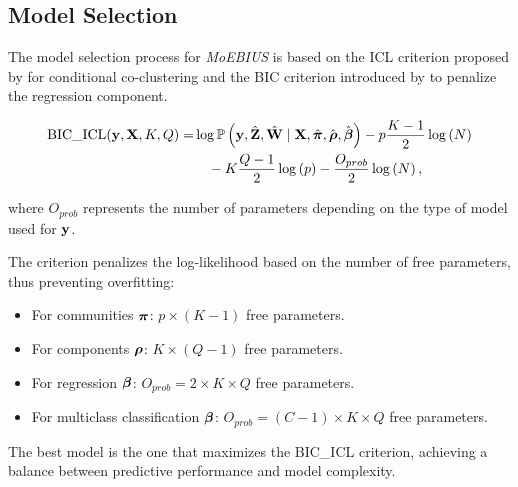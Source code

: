 



\subsection{Model Selection}

The model selection process for \textit{MoEBIUS} is based on the ICL criterion proposed by \cite{goffinet2020conditional} for conditional co-clustering and the BIC criterion introduced by \cite{schwarz1978estimating} to penalize the regression component.

\begin{align}
    \operatorname{BIC\_ICL}(\mathbf{y}, \mathbf{X},K,Q) =& \log \operatorname{\mathbb{P}} \left(\mathbf{y},\hat{\mathbf{Z}},\hat{\mathbf{W}} \mid \mathbf{X},  \hat{\boldsymbol{\pi}}, \hat{\boldsymbol{\rho}}, \hat{\boldsymbol{\beta}} \right) 
    - p \dfrac{K-1}{2} \log \left( N \right) \notag \\
    &\quad - K \dfrac{Q-1}{2} \log \left( p \right) 
    - \dfrac{O_{prob}}{2} \log\left(N\right),
\end{align}

where $O_{prob}$ represents the number of parameters depending on the type of model used for $\mathbf{y}$.

The criterion penalizes the log-likelihood based on the number of free parameters, thus preventing overfitting:
\begin{itemize}
    \item For communities $\boldsymbol{\pi}$: $p \times (K-1)$ free parameters.
    \item For components $\boldsymbol{\rho}$: $K \times (Q-1)$ free parameters.
    \item For regression $\boldsymbol{\beta}$: $O_{prob} = 2 \times K \times Q$ free parameters.
    \item For multiclass classification $\boldsymbol{\beta}$: $O_{prob} = (C-1) \times K \times Q$ free parameters.
\end{itemize}

The best model is the one that maximizes the BIC\_ICL criterion, achieving a balance between predictive performance and model complexity.